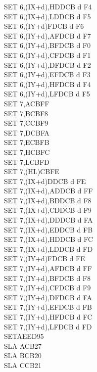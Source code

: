 \documentclass[12pt,twoside,openright,a4paper]{book}
\begin{document}
\begin{multicols}{3}
{\begin{tabbing}
		SET 6,(IX+d),H\UNDOC\>DDCB d F4\\
		SET 6,(IX+d),L\UNDOC\>DDCB d F5\\
		SET 6,(IY+d)\>FDCB d F6\\
		SET 6,(IY+d),A\UNDOC\>FDCB d F7\\
		SET 6,(IY+d),B\UNDOC\>FDCB d F0\\
		SET 6,(IY+d),C\UNDOC\>FDCB d F1\\
		SET 6,(IY+d),D\UNDOC\>FDCB d F2\\
		SET 6,(IY+d),E\UNDOC\>FDCB d F3\\
		SET 6,(IY+d),H\UNDOC\>FDCB d F4\\
		SET 6,(IY+d),L\UNDOC\>FDCB d F5\\
		SET 7,A\>CBFF\\
		SET 7,B\>CBF8\\
		SET 7,C\>CBF9\\
		SET 7,D\>CBFA\\
		SET 7,E\>CBFB\\
		SET 7,H\>CBFC\\
		SET 7,L\>CBFD\\
		SET 7,(HL)\>CBFE\\
		SET 7,(IX+d)\>DDCB d FE\\
		SET 7,(IX+d),A\UNDOC\>DDCB d FF\\
		SET 7,(IX+d),B\UNDOC\>DDCB d F8\\
		SET 7,(IX+d),C\UNDOC\>DDCB d F9\\
		SET 7,(IX+d),D\UNDOC\>DDCB d FA\\
		SET 7,(IX+d),E\UNDOC\>DDCB d FB\\
		SET 7,(IX+d),H\UNDOC\>DDCB d FC\\
		SET 7,(IX+d),L\UNDOC\>DDCB d FD\\
		SET 7,(IY+d)\>FDCB d FE\\
		SET 7,(IY+d),A\UNDOC\>FDCB d FF\\
		SET 7,(IY+d),B\UNDOC\>FDCB d F8\\
		SET 7,(IY+d),C\UNDOC\>FDCB d F9\\
		SET 7,(IY+d),D\UNDOC\>FDCB d FA\\
		SET 7,(IY+d),E\UNDOC\>FDCB d FB\\
		SET 7,(IY+d),H\UNDOC\>FDCB d FC\\
		SET 7,(IY+d),L\UNDOC\>FDCB d FD\\
		SETAE\ZXN\>ED95\\
		SLA A\>CB27\\
		SLA B\>CB20\\
		SLA C\>CB21\\

\end{tabbing}}
\end{multicols}
\end{document}
